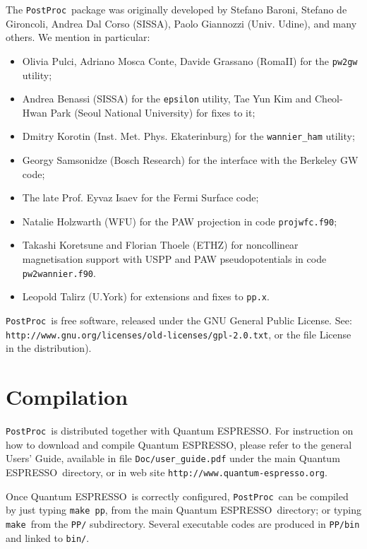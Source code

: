 \documentclass[12pt,a4paper]{article}
\def\qe{{\sc Quantum ESPRESSO}}
\def\PostProc{\texttt{PostProc}}
\def\make{\texttt{make}}
\begin{document}
The \PostProc\ package was originally developed by Stefano Baroni, 
Stefano de Gironcoli, Andrea Dal Corso (SISSA), Paolo Giannozzi 
(Univ. Udine), and many others. We mention in particular: 
\begin{itemize}
	\item Olivia Pulci, Adriano Mosca Conte, Davide Grassano (RomaII)
	for the \texttt{pw2gw} utility;
\item Andrea Benassi (SISSA) for the \texttt{epsilon} utility,
      Tae Yun Kim and Cheol-Hwan Park (Seoul National University)
      for fixes to it;
\item Dmitry Korotin (Inst. Met. Phys. Ekaterinburg) for the
      \texttt{wannier\_ham} utility;
\item Georgy Samsonidze (Bosch Research) for the interface
      with the Berkeley GW code;
\item The late Prof. Eyvaz Isaev for the Fermi Surface code;
\item Natalie Holzwarth (WFU) for the PAW projection in code
     \texttt{projwfc.f90};
\item Takashi Koretsune and Florian Thoele (ETHZ) for noncollinear 
      magnetisation support with USPP and PAW pseudopotentials in 
      code \texttt{pw2wannier.f90}.
\item Leopold Talirz (U.York) for extensions and fixes to \texttt{pp.x}.
\end{itemize}

\PostProc\ is free software, released under the 
GNU General Public License. See:\\
\texttt{http://www.gnu.org/licenses/old-licenses/gpl-2.0.txt}, 
or the file License in the distribution).
    


\section{Compilation}

\PostProc\ is distributed together with \qe.
For instruction on how to download and compile \qe, please refer 
to the general Users' Guide, available in file \texttt{Doc/user\_guide.pdf}
under the main \qe\ directory, or in web site 
\texttt{http://www.quantum-espresso.org}.

Once \qe\ is correctly configured, \PostProc\ can be compiled by
just typing \texttt{make pp}, from the main \qe\ directory;
or typing \make\ from the \texttt{PP/} subdirectory.
Several executable codes are produced in \texttt{PP/bin}
and linked to \texttt{bin/}.
\end{document}
